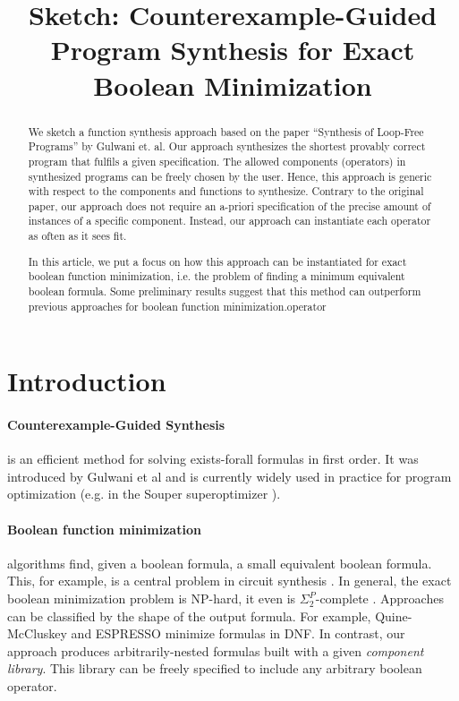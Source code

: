 \documentclass[a4paper]{article}
\begin{document}
\title{Sketch: Counterexample-Guided Program Synthesis for Exact Boolean Minimization}


\maketitle

\begin{abstract}
  We sketch a function synthesis approach based on the paper ``Synthesis of Loop-Free Programs'' \cite{DBLP:conf/pldi/GulwaniJTV11} by Gulwani et. al.
  Our approach synthesizes the shortest provably correct program that fulfils a given specification. The allowed components (operators) in synthesized programs can be freely chosen by the user. Hence, this approach is generic with respect to the components and functions to synthesize.
  Contrary to the original paper, our approach does not require an a-priori specification of the precise amount of instances of a specific component. Instead, our approach can instantiate each operator as often as it sees fit.

  In this article, we put a focus on how this approach can be instantiated for exact boolean function minimization, i.e. the problem of finding a minimum equivalent boolean formula. Some preliminary results suggest that this method can outperform previous approaches for boolean function minimization.operator
\end{abstract}

\section{Introduction}

\paragraph*{Counterexample-Guided Synthesis} is an efficient method for solving exists-forall formulas in first order. It was introduced by Gulwani et al \cite{DBLP:conf/pldi/GulwaniJTV11} and is currently widely used in practice for program optimization (e.g. in the Souper superoptimizer \cite{Souper}).

\paragraph*{Boolean function minimization} algorithms find, given a boolean formula, a small equivalent boolean formula. This, for example, is a central problem in circuit synthesis \cite{brayton1984espresso, Rudell:M86/65}. In general, the exact boolean minimization problem is NP-hard, it even is $\Sigma_2^P$-complete \cite{DBLP:conf/icalp/BuchfuhrerU08}.
Approaches can be classified by the shape of the output formula. For example, Quine-McCluskey and ESPRESSO minimize formulas in DNF. In contrast, our approach produces arbitrarily-nested formulas built with a given \emph{component library}. This library can be freely specified to include any arbitrary boolean operator.
\end{document}

